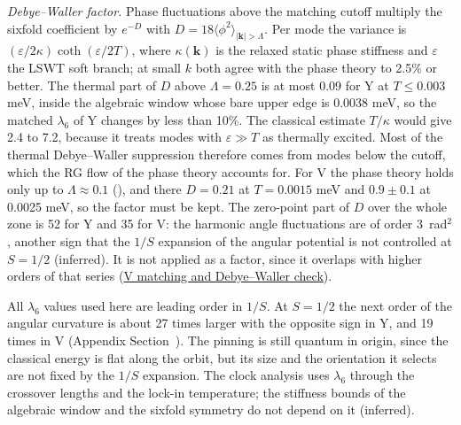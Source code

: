 \emph{Debye--Waller factor.} Phase fluctuations above the matching
cutoff multiply the sixfold coefficient by \(e^{-D}\) with
\(D=18\langle\phi^2\rangle_{|\mathbf k|>\Lambda}\). Per mode the
variance is \((\varepsilon/2\kappa)\coth(\varepsilon/2T)\), where
\(\kappa(\mathbf k)\) is the relaxed static phase stiffness and
\(\varepsilon\) the LSWT soft branch; at small \(k\) both agree with the
phase theory to 2.5\% or better. The thermal part of \(D\) above
\(\Lambda=0.25\) is at most 0.09 for Y at \(T\le0.003\) meV, inside the
algebraic window whose bare upper edge is 0.0038 meV, so the matched
\(\lambda_6\) of Y changes by less than 10\%. The classical estimate
\(T/\kappa\) would give 2.4 to 7.2, because it treats modes with
\(\varepsilon\gg T\) as thermally excited. Most of the thermal
Debye--Waller suppression therefore comes from modes below the cutoff,
which the RG flow of the phase theory accounts for. For V the phase
theory holds only up to \(\Lambda\approx0.1\)
(), and there
\(D=0.21\) at \(T=0.0015\) meV and \(0.9\pm0.1\) at 0.0025 meV, so the
factor must be kept. The zero-point part of \(D\) over the whole zone is
52 for Y and 35 for V: the harmonic angle fluctuations are of order
3~rad\(^2\), another sign that the \(1/S\) expansion of the angular
potential is not controlled at \(S=1/2\) (inferred). It is not applied
as a factor, since it overlaps with higher orders of that series
(\href{../../../data-space/verification/261005-v-matching-debye-waller/v-matching-debye-waller.json}{V
matching and Debye--Waller check}).

All \(\lambda_6\) values used here are leading order in \(1/S\). At
\(S=1/2\) the next order of the angular curvature is about 27 times
larger with the opposite sign in Y, and 19 times in V
(Appendix Section~). The pinning is still
quantum in origin, since the classical energy is flat along the orbit,
but its size and the orientation it selects are not fixed by the
\(1/S\) expansion. The clock analysis uses \(\lambda_6\) through the
crossover lengths and the lock-in temperature; the stiffness bounds of
the algebraic window and the sixfold symmetry do not depend on it
(inferred).

